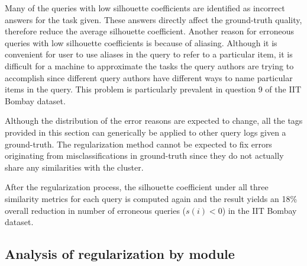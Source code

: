 Many of the queries with low silhouette coefficients are identified as incorrect answers for the task given. These answers directly affect the ground-truth quality, therefore reduce the average silhouette coefficient. Another reason for erroneous queries with low silhouette coefficients is because of aliasing. Although it is convenient for user to use aliases in the query to refer to a particular item, it is difficult for a machine to approximate the tasks the query authors are trying to accomplish since different query authors have different ways to name particular items in the query. This problem is particularly prevalent in question 9 of the IIT Bombay dataset.

Although the distribution of the error reasons are expected to change, all the tags provided in this section can generically be applied to other query logs given a ground-truth. The regularization method cannot be expected to fix errors originating from misclassifications in ground-truth since they do not actually share any similarities with the cluster. 

After the regularization process, the silhouette coefficient under all three similarity metrics for each query is computed again and the result yields an 18\% overall reduction in number of erroneous queries ($s(i) < 0$)  in the IIT Bombay dataset. 





\subsection{Analysis of regularization by module}
\label{subsec:modules}

